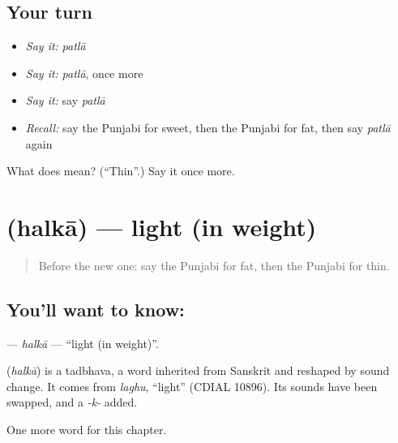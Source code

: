 \subsection*{Your turn}
\begin{itemize}
\raggedright
  \item \emph{Say it:} \emph{patlā}
  \item \emph{Say it:} \emph{patlā}, once more
  \item \emph{Say it:} say \emph{patlā}
  \item \emph{Recall:} say the Punjabi for sweet, then the Punjabi for fat, then say \emph{patlā} again
\end{itemize}

\begin{tcolorbox}[breakable,colback=teal!4,colframe=teal!35!black,title={Before you move on}]
What does  mean? (\textquotedblleft{}Thin\textquotedblright{}.) Say it once more.
\end{tcolorbox}
\section[\texorpdfstring{\pa{ਹਲਕਾ} (halkā)}{ਹਲਕਾ (halkā)}]{ (halkā) — light (in weight)}

\label{lesson:PA-C83-halka}



\begin{quote}
Before the new one: say the Punjabi for fat, then the Punjabi for thin.
\end{quote}

\subsection*{You'll want to know: }
\textbf{} — \emph{halkā} — \textquotedblleft{}light (in weight)\textquotedblright{}.

\begin{cousinweb}
\textbf{} (\emph{halkā}) is a tadbhava, a word inherited from Sanskrit and reshaped by sound change. It comes from \emph{laghu}, \textquotedblleft{}light\textquotedblright{} (CDIAL 10896). Its sounds have been swapped, and a \emph{-k-} added.
\end{cousinweb}

\begin{grammarlens}[title={What you've built}]
One more word for this chapter.
\end{grammarlens}

